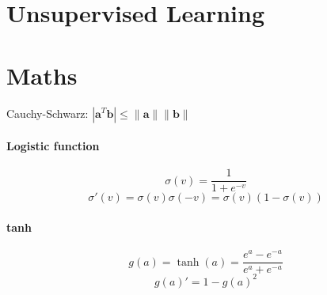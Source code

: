\documentclass[7pt]{scrartcl}
\begin{document}
\begin{multicols}{4}
\section{Unsupervised Learning}
\section{Maths}
Cauchy-Schwarz: $|\mathbf a ^T \mathbf b|\leq \| \mathbf a \| \| \mathbf b \|$
\paragraph{Logistic function}
$$\sigma(v) = \frac{1}{1+e^{-v}}$$
$$\sigma'(v) = \sigma(v)\sigma(-v) = \sigma(v)(1-\sigma(v))$$
\paragraph{tanh}
$$g(a)=\tanh(a)=\frac{e^a-e^{-a}}{e^a + e^{-a}}$$
$$g(a)'=1 - g(a)^2$$
\end{multicols}
\end{document}
